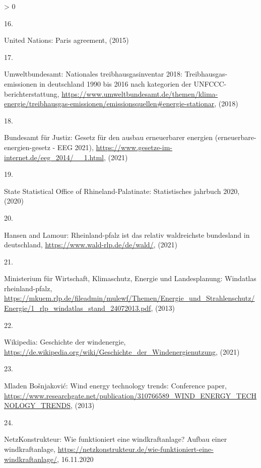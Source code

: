\documentclass[a4paper,11pt]{article}
\newlength{\cslhangindent}
\newlength{\csllabelwidth}
\newenvironment{CSLReferences}[3] %
 {%
  \setlength{\parindent}{0pt}
  \ifodd #1 \everypar{\setlength{\hangindent}{\cslhangindent}}\ignorespaces\fi
  \ifnum #2 > 0
  \setlength{\parskip}{#2\baselineskip}
  \fi
 }%
 {}
\newcommand{\CSLLeftMargin}[1]{\parbox[t]{\maxof{\widthof{#1}}{\csllabelwidth}}{#1}}
\newcommand{\CSLRightInline}[1]{\parbox[t]{\linewidth}{#1}}
\begin{document}
\begin{CSLReferences}{0}{0}
\leavevmode\hypertarget{ref-UnitedNations.2015}{}%
\CSLLeftMargin{16. }
\CSLRightInline{United Nations: Paris agreement, (2015)}

\leavevmode\hypertarget{ref-Umweltbundesamt.2018}{}%
\CSLLeftMargin{17. }
\CSLRightInline{Umweltbundesamt: Nationales treibhausgasinventar 2018: Treibhausgas-emissionen in deutschland 1990 bis 2016 nach kategorien der UNFCCC-berichterstattung, \url{https://www.umweltbundesamt.de/themen/klima-energie/treibhausgas-emissionen/emissionsquellen\#energie-stationar}, (2018)}

\leavevmode\hypertarget{ref-BundesamtfurJustiz.2021}{}%
\CSLLeftMargin{18. }
\CSLRightInline{Bundesamt für Justiz: Gesetz f{ü}r den ausbau erneuerbarer energien (erneuerbare-energien-gesetz - EEG 2021), \url{https://www.gesetze-im-internet.de/eeg_2014/__1.html}, (2021)}

\leavevmode\hypertarget{ref-StateStatisticalOfficeofRhinelandPalatinate.2020}{}%
\CSLLeftMargin{19. }
\CSLRightInline{State Statistical Office of Rhineland-Palatinate: Statistisches jahrbuch 2020, (2020)}

\leavevmode\hypertarget{ref-HansenandLamour.2021}{}%
\CSLLeftMargin{20. }
\CSLRightInline{Hansen and Lamour: Rheinland-pfalz ist das relativ waldreichste bundesland in deutschland, \url{https://www.wald-rlp.de/de/wald/}, (2021)}

\leavevmode\hypertarget{ref-MinisteriumfurWirtschaftKlimaschutzEnergieundLandesplanung.2013}{}%
\CSLLeftMargin{21. }
\CSLRightInline{Ministerium für Wirtschaft, Klimaschutz, Energie und Landesplanung: Windatlas rheinland-pfalz, \url{https://mkuem.rlp.de/fileadmin/mulewf/Themen/Energie_und_Strahlenschutz/Energie/1_rlp_windatlas_stand_24072013.pdf}, (2013)}

\leavevmode\hypertarget{ref-Wikipedia.2021}{}%
\CSLLeftMargin{22. }
\CSLRightInline{Wikipedia: Geschichte der windenergie, \url{https://de.wikipedia.org/wiki/Geschichte_der_Windenergienutzung}, (2021)}

\leavevmode\hypertarget{ref-MladenBosnjakovic.2013}{}%
\CSLLeftMargin{23. }
\CSLRightInline{Mladen Bošnjaković: Wind energy technology trends: Conference paper, \url{https://www.researchgate.net/publication/310766589_WIND_ENERGY_TECHNOLOGY_TRENDS}, (2013)}

\leavevmode\hypertarget{ref-NetzKonstrukteur.16.11.2020}{}%
\CSLLeftMargin{24. }
\CSLRightInline{NetzKonstrukteur: Wie funktioniert eine windkraftanlage? Aufbau einer windkraftanlage, \url{https://netzkonstrukteur.de/wie-funktioniert-eine-windkraftanlage/}, 16.11.2020}


\end{CSLReferences}
\end{document}
